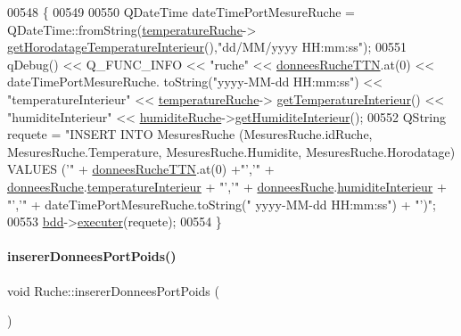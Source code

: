 \begin{DoxyCode}
00548 \{
00549 
00550     QDateTime dateTimePortMesureRuche = QDateTime::fromString(\hyperlink{class_ruche_af721fb92f801a9b1f3ef3aa9867cf3de}{temperatureRuche}->
      \hyperlink{class_infos_temperature_aca40f109786cf22d78402f8b7f3fe408}{getHorodatageTemperatureInterieur}(),\textcolor{stringliteral}{"dd/MM/yyyy HH:mm:ss"});
00551     qDebug() << Q\_FUNC\_INFO << \textcolor{stringliteral}{"ruche"} << \hyperlink{class_ruche_a4556832042641c08a6ef2ab9d80d771e}{donneesRucheTTN}.at(0) << dateTimePortMesureRuche.
      toString(\textcolor{stringliteral}{"yyyy-MM-dd  HH:mm:ss"}) << \textcolor{stringliteral}{"temperatureInterieur"} <<  \hyperlink{class_ruche_af721fb92f801a9b1f3ef3aa9867cf3de}{temperatureRuche}->
      \hyperlink{class_infos_temperature_aaf4cb4fd8a7c46d14955d3175498f91c}{getTemperatureInterieur}() << \textcolor{stringliteral}{"humiditeInterieur"} << 
      \hyperlink{class_ruche_acb380928928e693a1933c4cf607ddf80}{humiditeRuche}->\hyperlink{class_infos_humidite_a652f7ca3e4b97352034fed62c6d865b7}{getHumiditeInterieur}();
00552     QString requete = \textcolor{stringliteral}{"INSERT INTO MesuresRuche (MesuresRuche.idRuche, MesuresRuche.Temperature,
       MesuresRuche.Humidite, MesuresRuche.Horodatage) VALUES ('"} + \hyperlink{class_ruche_a4556832042641c08a6ef2ab9d80d771e}{donneesRucheTTN}.at(0) +\textcolor{stringliteral}{"','"} + 
      \hyperlink{class_ruche_a1526bfa78f03e0710ad16f880a40c15f}{donneesRuche}.\hyperlink{struct_donnees_ruche_ad6cbda133d2c8abc23fb688d6e565ab2}{temperatureInterieur} + \textcolor{stringliteral}{"','"} + 
      \hyperlink{class_ruche_a1526bfa78f03e0710ad16f880a40c15f}{donneesRuche}.\hyperlink{struct_donnees_ruche_a2541ee93816a11da7367b36d4bedc77b}{humiditeInterieur} +  \textcolor{stringliteral}{"','"} + dateTimePortMesureRuche.toString(\textcolor{stringliteral}{"
      yyyy-MM-dd  HH:mm:ss"}) + \textcolor{stringliteral}{"')"};
00553     \hyperlink{class_ruche_a8577fdedabdecd98652e338e83bb3b65}{bdd}->\hyperlink{class_base_de_donnees_aa8de5f8f8bb17edc43f5c0ee33712081}{executer}(requete);
00554 \}
\end{DoxyCode}
\mbox{\label{class_ruche_a923f42fc4878a01f6102966a748e8f37}} 
\paragraph{\texorpdfstring{inserer\+Donnees\+Port\+Poids()}{insererDonneesPortPoids()}}
{\footnotesize\ttfamily void Ruche\+::inserer\+Donnees\+Port\+Poids (\begin{DoxyParamCaption}{ }\end{DoxyParamCaption})\hspace{0.3cm}{\ttfamily [private]}}



